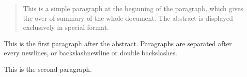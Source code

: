 \documentclass{article}
\begin{document}
\begin{abstract}
This is a simple paragraph at the beginning of the paragraph, which gives the over of summary of the whole document. The abstract is displayed exclusively in special format. 
\end{abstract}
This is the first paragraph after the abstract. Paragraphs are separated after every newlines, or backslashnewline or double backslashes.

This is the second paragraph.
\end{document}
